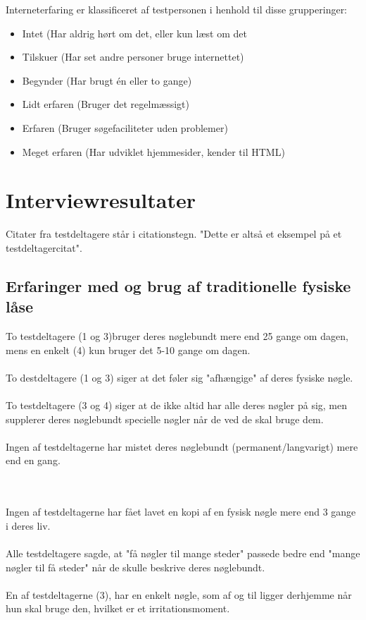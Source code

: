 \documentclass[a4paper,12pt]{article}
\begin{document}
Interneterfaring er klassificeret af testpersonen i henhold til disse grupperinger:
\begin{itemize}


\item Intet (Har aldrig hørt om det, eller kun læst om det 
\item Tilskuer (Har set andre personer bruge internettet)  
\item Begynder (Har brugt én eller to gange)
\item Lidt erfaren (Bruger det regelmæssigt)
\item Erfaren (Bruger søgefaciliteter uden problemer)
\item Meget erfaren (Har udviklet hjemmesider, kender til HTML)

\end{itemize}

\section{Interviewresultater}
Citater fra testdeltagere står i citationstegn. "Dette er altså et eksempel på et testdeltagercitat".
\subsection{Erfaringer med og brug af traditionelle fysiske låse}

To testdeltagere (1 og 3)bruger deres nøglebundt mere end 25 gange om dagen, mens en enkelt (4) kun bruger det 5-10 gange om dagen.
\\ \\
To destdeltagere (1 og 3) siger at det føler sig "afhængige" af deres fysiske nøgle.
\\ \\
To testdeltagere (3 og 4) siger at de ikke altid har alle deres nøgler på sig, men supplerer deres nøglebundt specielle nøgler når de ved de skal bruge dem.
\\ \\
Ingen af testdeltagerne har mistet deres nøglebundt (permanent/langvarigt) mere end en gang.

\\ \\
Ingen af testdeltagerne har fået lavet en kopi af en fysisk nøgle mere end 3 gange i deres liv.
\\ \\
Alle testdeltagere sagde, at "få nøgler til mange steder" passede bedre end "mange nøgler til få steder" når de skulle beskrive deres nøglebundt.
\\ \\
En af testdeltagerne (3), har en enkelt nøgle, som af og til ligger derhjemme når hun skal bruge den, hvilket er et irritationsmoment.
\end{document}
